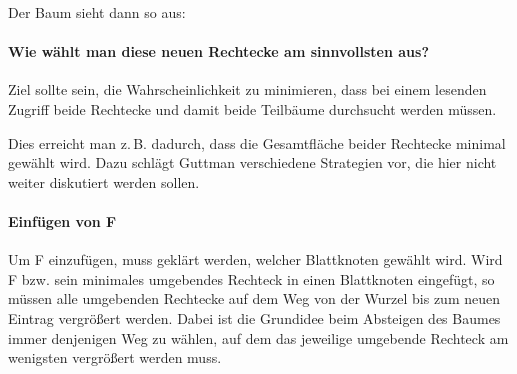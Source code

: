 \begin{enumerate}[a)]
\begin{solution}
		Der Baum sieht dann so aus:
		\begin{center}
		\end{center}


		\paragraph{Wie wählt man diese neuen Rechtecke am sinnvollsten aus?}

		Ziel sollte sein, die Wahrscheinlichkeit zu minimieren, dass bei einem lesenden Zugriff beide Rechtecke und damit beide Teilbäume durchsucht werden müssen.

		Dies erreicht man z.\,B. dadurch, dass die Gesamtfläche beider Rechtecke minimal gewählt wird.
		Dazu schlägt Guttman verschiedene Strategien vor, die hier nicht weiter diskutiert werden sollen.

		\paragraph{Einfügen von F}

		Um F einzufügen, muss geklärt werden, welcher Blattknoten gewählt wird.
		Wird F bzw. sein minimales umgebendes Rechteck in einen Blattknoten eingefügt, so müssen alle umgebenden Rechtecke auf dem Weg von der Wurzel bis zum neuen Eintrag vergrößert werden.
		Dabei ist die Grundidee beim Absteigen des Baumes immer denjenigen Weg zu wählen, auf dem das jeweilige umgebende Rechteck am wenigsten vergrößert werden muss.


\end{solution}
\end{enumerate}
